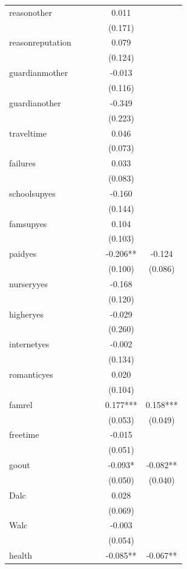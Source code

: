 \documentclass[12pt,english]{article}
\begin{document}
\begin{longtable}[c]{lccccc}
reasonother &  &  &  & 0.011 & \\
 &  &  &  & (0.171) & \\
reasonreputation &  &  &  & 0.079 & \\
 &  &  &  & (0.124) & \\
guardianmother &  &  &  & -0.013 & \\
 &  &  &  & (0.116) & \\
guardianother &  &  &  & -0.349 & \\
 &  &  &  & (0.223) & \\
traveltime &  &  &  & 0.046 & \\
 &  &  &  & (0.073) & \\
failures &  &  &  & 0.033 & \\
 &  &  &  & (0.083) & \\
schoolsupyes &  &  &  & -0.160 & \\
 &  &  &  & (0.144) & \\
famsupyes &  &  &  & 0.104 & \\
 &  &  &  & (0.103) & \\
paidyes &  &  &  & -0.206** & -0.124\\
 &  &  &  & (0.100) & (0.086)\\
nurseryyes &  &  &  & -0.168 & \\
 &  &  &  & (0.120) & \\
higheryes &  &  &  & -0.029 & \\
 &  &  &  & (0.260) & \\
internetyes &  &  &  & -0.002 & \\
 &  &  &  & (0.134) & \\
romanticyes &  &  &  & 0.020 & \\
 &  &  &  & (0.104) & \\
famrel &  &  &  & 0.177*** & 0.158***\\
 &  &  &  & (0.053) & (0.049)\\
freetime &  &  &  & -0.015 & \\
 &  &  &  & (0.051) & \\
goout &  &  &  & -0.093* & -0.082**\\
 &  &  &  & (0.050) & (0.040)\\
Dalc &  &  &  & 0.028 & \\
 &  &  &  & (0.069) & \\
Walc &  &  &  & -0.003 & \\
 &  &  &  & (0.054) & \\
health &  &  &  & -0.085** & -0.067**\\

\end{longtable}
\end{document}
